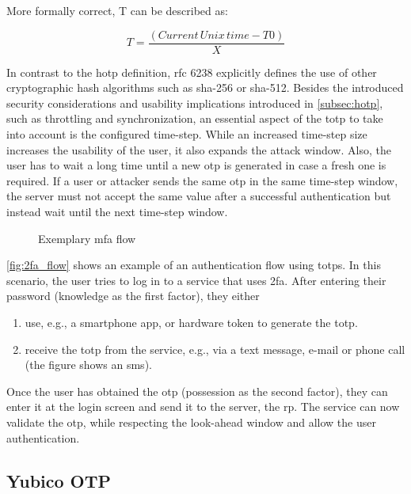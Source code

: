More formally correct, T can be described as:

\begin{equation*}
	T = \frac{(Current\, Unix\, time - T0)}{X}
\end{equation*}

In contrast to the \gls{hotp} definition, \gls{rfc} 6238 explicitly defines the use of other cryptographic hash algorithms such as \gls{sha}-256 or \gls{sha}-512. Besides the introduced security considerations and usability implications introduced in \autoref{subsec:hotp}, such as throttling and synchronization, an essential aspect of the \gls{totp} to take into account is the configured time-step. While an increased time-step size increases the usability of the user, it also expands the attack window. Also, the user has to wait a long time until a new \gls{otp} is generated in case a fresh one is required. If a user or attacker sends the same \gls{otp} in the same time-step window, the server must not accept the same value after a successful authentication but instead wait until the next time-step window.

\begin{figure}[hbt]
	\centering
	
	\caption[Exemplary \gls{mfa} flow]{Exemplary \gls{mfa} flow\footnotemark}
	\label{fig:2fa_flow}
\end{figure}

\autoref{fig:2fa_flow} shows an example of an authentication flow using \glspl{totp}. In this scenario, the user tries to log in to a service that uses \gls{2fa}. After entering their password (knowledge as the first factor), they either

\begin{enumerate}[label=(\alph*)]
	\item use, e.g., a smartphone app, or hardware token to generate the \gls{totp}.
	\item receive the \gls{totp} from the service, e.g., via a text message, e-mail or phone call (the figure shows an \gls{sms}).
\end{enumerate}

Once the user has obtained the \gls{otp} (possession as the second factor), they can enter it at the login screen and send it to the server, the \gls{rp}. The service can now validate the \gls{otp}, while respecting the look-ahead window and allow the user authentication.

\subsection{Yubico OTP}

